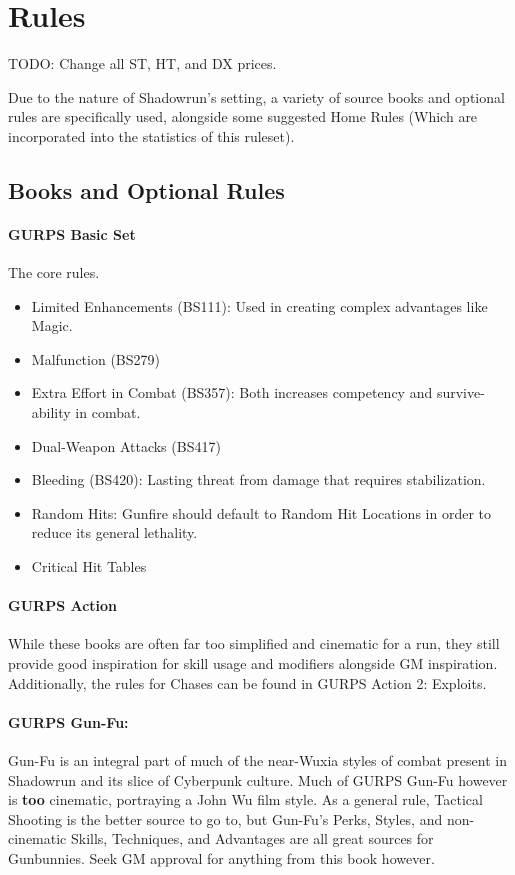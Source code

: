 \section{Rules}

\begin{multicols*}{3}
	TODO: Change all ST, HT, and DX prices.
	
	Due to the nature of Shadowrun's setting, a variety of source books and optional rules are specifically used, alongside some suggested Home Rules (Which are incorporated into the statistics of this ruleset).
	
	\subsection{Books and Optional Rules}
	
	\paragraph{GURPS Basic Set}
	The core rules.
	\begin{itemize}
		\itemsep0em 
		\item Limited Enhancements (BS111): Used in creating complex advantages like Magic.
		\item Malfunction (BS279)
		\item Extra Effort in Combat (BS357): Both increases competency and survive-ability in combat.
		\item Dual-Weapon Attacks (BS417)
		\item Bleeding (BS420): Lasting threat from damage that requires stabilization.
		\item Random Hits: Gunfire should default to Random Hit Locations in order to reduce its general lethality.
		\item Critical Hit Tables
	\end{itemize}

	\paragraph{GURPS Action}
	While these books are often far too simplified and cinematic for a run, they still provide good inspiration for skill usage and modifiers alongside GM inspiration. Additionally, the rules for Chases can be found in GURPS Action 2: Exploits.
	
	\paragraph{GURPS Gun-Fu:}
	Gun-Fu is an integral part of much of the near-Wuxia styles of combat present in Shadowrun and its slice of Cyberpunk culture. Much of GURPS Gun-Fu however is \textbf{too} cinematic, portraying a John Wu film style. As a general rule, Tactical Shooting is the better source to go to, but Gun-Fu's Perks, Styles, and non-cinematic Skills, Techniques, and Advantages are all great sources for Gunbunnies. Seek GM approval for anything from this book however.
	

\end{multicols*}
